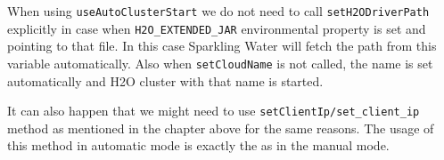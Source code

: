 When using \texttt{useAutoClusterStart} we do not need to call \texttt{setH2ODriverPath} explicitly in case when \texttt{H2O\_EXTENDED\_JAR} environmental property is set and pointing to that file. In this case Sparkling Water will fetch the path from this variable automatically. Also when \texttt{setCloudName} is not called, the name is set automatically and H2O cluster with that name is started.

It can also happen that we might need to use \texttt{setClientIp/set\_client\_ip} method as mentioned in the chapter above for the same reasons. The usage of this method in automatic mode is exactly the as in the manual mode.
